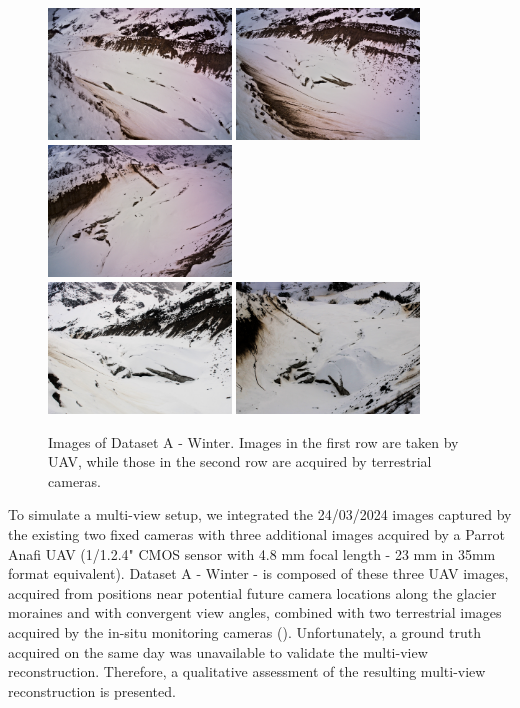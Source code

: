 \begin{figure}
  \centering
    \includegraphics[height=3.5cm]{winter_img_1}
    \includegraphics[height=3.5cm]{winter_img_2}
    \includegraphics[height=3.5cm]{winter_img_5} \\ \vspace{1mm}
    \includegraphics[height=3.5cm]{winter_img_3}
    \includegraphics[height=3.5cm]{winter_img_4}
  \caption{Images of Dataset A - Winter. Images in the first row are taken by UAV, while those in the second row are acquired by terrestrial cameras.}
  \label{fig:5:winter_images}
\end{figure}

To simulate a multi-view setup, we integrated the 24/03/2024 images captured by the existing two fixed cameras with three additional images acquired by a Parrot Anafi UAV (1/1.2.4" CMOS sensor with 4.8 mm focal length - 23 mm in 35mm format equivalent).
Dataset A - Winter - is composed of these three UAV images, acquired from positions near potential future camera locations along the glacier moraines and with convergent view angles, combined with two terrestrial images acquired by the in-situ monitoring cameras ().
Unfortunately, a ground truth acquired on the same day was unavailable to validate the multi-view reconstruction. 
Therefore, a qualitative assessment of the resulting multi-view reconstruction is presented.

